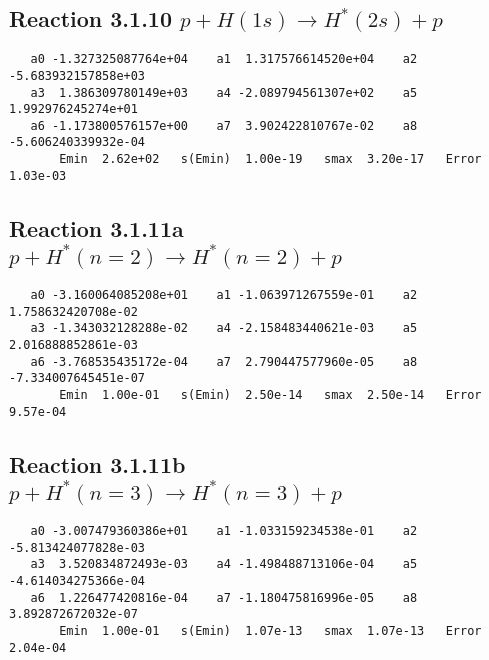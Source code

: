 \documentclass[12pt]{article}
\begin{document}
\newpage
\subsection{
Reaction 3.1.10 $   p + H(1s) \rightarrow H^*(2s) + p$}


\begin{small}\begin{verbatim}
   a0 -1.327325087764e+04    a1  1.317576614520e+04    a2 -5.683932157858e+03
   a3  1.386309780149e+03    a4 -2.089794561307e+02    a5  1.992976245274e+01
   a6 -1.173800576157e+00    a7  3.902422810767e-02    a8 -5.606240339932e-04
       Emin  2.62e+02   s(Emin)  1.00e-19   smax  3.20e-17   Error  1.03e-03
\end{verbatim}\end{small}


\newpage
\subsection{Reaction 3.1.11a $   p + H^*(n=2) \rightarrow H^*(n=2) + p$}


\begin{small}\begin{verbatim}
   a0 -3.160064085208e+01    a1 -1.063971267559e-01    a2  1.758632420708e-02
   a3 -1.343032128288e-02    a4 -2.158483440621e-03    a5  2.016888852861e-03
   a6 -3.768535435172e-04    a7  2.790447577960e-05    a8 -7.334007645451e-07
       Emin  1.00e-01   s(Emin)  2.50e-14   smax  2.50e-14   Error  9.57e-04
\end{verbatim}\end{small}


\newpage
\subsection{
Reaction 3.1.11b $p + H^*(n=3) \rightarrow H^*(n=3) + p$}















\begin{small}\begin{verbatim}
   a0 -3.007479360386e+01    a1 -1.033159234538e-01    a2 -5.813424077828e-03
   a3  3.520834872493e-03    a4 -1.498488713106e-04    a5 -4.614034275366e-04
   a6  1.226477420816e-04    a7 -1.180475816996e-05    a8  3.892872672032e-07
       Emin  1.00e-01   s(Emin)  1.07e-13   smax  1.07e-13   Error  2.04e-04
\end{verbatim}\end{small}
\end{document}
